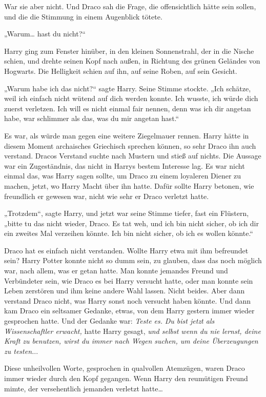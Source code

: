 {War sie aber nicht. Und Draco sah die Frage, die offensichtlich hätte sein sollen, und die die Stimmung in einem Augenblick tötete.

„Warum… hast du nicht?“

Harry ging zum Fenster hinüber, in den kleinen Sonnenstrahl, der in die Nische schien, und drehte seinen Kopf nach außen, in Richtung des grünen Geländes von Hogwarts. Die Helligkeit schien auf ihn, auf seine Roben, auf sein Gesicht.

„Warum habe ich das nicht?“ sagte Harry. Seine Stimme stockte. „Ich schätze, weil ich einfach nicht wütend auf dich werden konnte. Ich wusste, ich würde dich zuerst verletzen. Ich will es nicht einmal fair nennen, denn was ich dir angetan habe, war schlimmer als das, was du mir angetan hast.“

Es war, als würde man gegen eine weitere Ziegelmauer rennen. Harry hätte in diesem Moment archaisches Griechisch sprechen können, so sehr Draco ihn auch verstand. Dracos Verstand suchte nach Mustern und stieß auf nichts. Die Aussage war ein Zugeständnis, das nicht in Harrys bestem Interesse lag. Es war nicht einmal das, was Harry sagen sollte, um Draco zu einem loyaleren Diener zu machen, jetzt, wo Harry Macht über ihn hatte. Dafür sollte Harry betonen, wie freundlich er gewesen war, nicht wie sehr er Draco verletzt hatte.

„Trotzdem“, sagte Harry, und jetzt war seine Stimme tiefer, fast ein Flüstern, „bitte tu das nicht wieder, Draco. Es tat weh, und ich bin nicht sicher, ob ich dir ein zweites Mal verzeihen könnte. Ich bin nicht sicher, ob ich es wollen könnte.“

Draco hat es einfach nicht verstanden. Wollte Harry etwa mit ihm befreundet sein? Harry Potter konnte nicht so dumm sein, zu glauben, dass das noch möglich war, nach allem, was er getan hatte. Man konnte jemandes Freund und Verbündeter sein, wie Draco es bei Harry versucht hatte, oder man konnte sein Leben zerstören und ihm keine andere Wahl lassen. Nicht beides. Aber dann verstand Draco nicht, was Harry sonst noch versucht haben könnte. Und dann kam Draco ein seltsamer Gedanke, etwas, von dem Harry gestern immer wieder gesprochen hatte. Und der Gedanke war: \emph{Teste es.} \emph{Du bist jetzt als Wissenschaftler erwacht,} hatte Harry gesagt, \emph{und selbst wenn du nie lernst, deine Kraft zu benutzen, wirst du immer nach Wegen suchen, um deine Überzeugungen zu testen.}..

Diese unheilvollen Worte, gesprochen in qualvollen Atemzügen, waren Draco immer wieder durch den Kopf gegangen. Wenn Harry den reumütigen Freund mimte, der versehentlich jemanden verletzt hatte…

}
